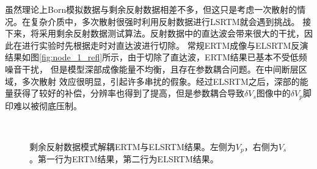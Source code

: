 虽然理论上Born模拟数据与剩余反射数据相差不多，但这只是考虑一次散射的情况。在复杂介质中，多次散射很强时利用反射数据进行LSRTM就会遇到挑战。
接下来，将采用剩余反射数据测试算法。反射数据中的直达波会带来很大的干扰，因此在进行实验时先根据走时对直达波进行切除。
常规ERTM成像与ELSRTM反演结果如图\ref{fig:node_1_refl}所示，由于切除了直达波，ERTM结果已基本不受低频噪音干扰，
但是模型深部成像能量不均衡，且存在参数耦合问题。在中间断层区域，多次散射
效应很明显，引起许多串扰的假象。经过ELSRTM之后，深部的能量获得了较好的补偿，分辨率也得到了提高，但是参数耦合导致$\delta
V_s$图像中的$\delta V_p$脚印难以被彻底压制。
\begin{figure}[!hbt]
   \centering
   \\
   \caption{剩余反射数据模式解耦ERTM与ELSRTM结果。左侧为$V_p$，右侧为$V_s$。第一行为ERTM结果，第二行为ELSRTM结果。}
   \label{fig:de_1_refl}
\end{figure}

